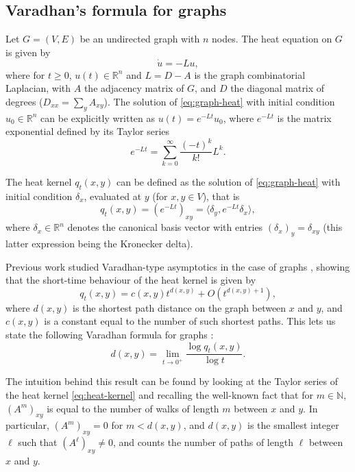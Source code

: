 \documentclass[11pt]{article}
\def\N{\mathbb{N}}
\def\R{\mathbb{R}}
\def\log{\operatorname{log}}
\theoremstyle{definition}
\begin{document}
\subsection{Varadhan's formula for graphs} \label{sec:varadhan-graphs}

Let $G = (V,E)$ be an undirected graph with $n$ nodes. The heat equation on $G$ is given by
\begin{equation} \label{eq:graph-heat}
 \dot{u} = -Lu, 
\end{equation}
where for $t\ge 0$, $u(t) \in \R^n$ and $L=D-A$ is the graph combinatorial Laplacian, with $A$ the adjacency matrix of $G$, and $D$ the diagonal matrix of degrees ($D_{xx} = \sum_{y}A_{xy}$). The solution of \eqref{eq:graph-heat} with initial condition $u_0 \in \R^n$ can be explicitly written as $ u(t) = e^{-Lt} u_0$, where $e^{-Lt}$ is the matrix exponential defined by its Taylor series
\begin{equation} \label{eq:heat-kernel}
 e^{-Lt} = \sum_{k=0}^\infty \frac{(-t)^k}{k!} L^k. 
\end{equation}

The heat kernel $q_t (x,y)$ can be defined as the solution of \eqref{eq:graph-heat} with initial condition $\delta_x$, evaluated at $y$ (for $x,y \in V$), that is
$$ q_t(x,y) = (e^{-Lt})_{xy} = \langle \delta_y, e^{-Lt} \delta_x \rangle, $$
where $\delta_x \in \R^n$ denotes the canonical basis vector with entries $(\delta_x)_y = \delta_{xy}$ (this latter expression being the Kronecker delta).

Previous work studied Varadhan-type asymptotics in the case of graphs \cite{kellerNoteShorttimeBehavior2016,steinerbergerVaradhanAsymptoticsHeat2019}, showing that the short-time behaviour of the heat kernel is given by
$$ q_t (x,y) = c(x,y) t^{d(x,y)} + O(t^{d(x,y)+1}), $$
where $d(x,y)$ is the shortest path distance on the graph between $x$ and $y$, and $c(x,y)$ is a constant equal to the number of such shortest paths. This lets us state the following Varadhan formula for graphs \cite{kellerNoteShorttimeBehavior2016}:
\begin{equation} \label{eq:graph-varadhan} 
    d(x,y) = \lim_{t\rightarrow 0^+} \frac{\log q_t (x,y)}{\log t}.
\end{equation}

The intuition behind this result can be found by looking at the Taylor series of the heat kernel \eqref{eq:heat-kernel} and recalling the well-known fact that for $m \in \N$, $(A^m)_{xy}$ is equal to the number of walks of length $m$ between $x$ and $y$. In particular, $(A^m)_{xy} = 0$ for $m < d(x,y)$, and $d(x,y)$ is the smallest integer $\ell$ such that $(A^\ell)_{xy} \neq 0$, and counts the number of paths of length $\ell$ between $x$ and $y$.
\end{document}
